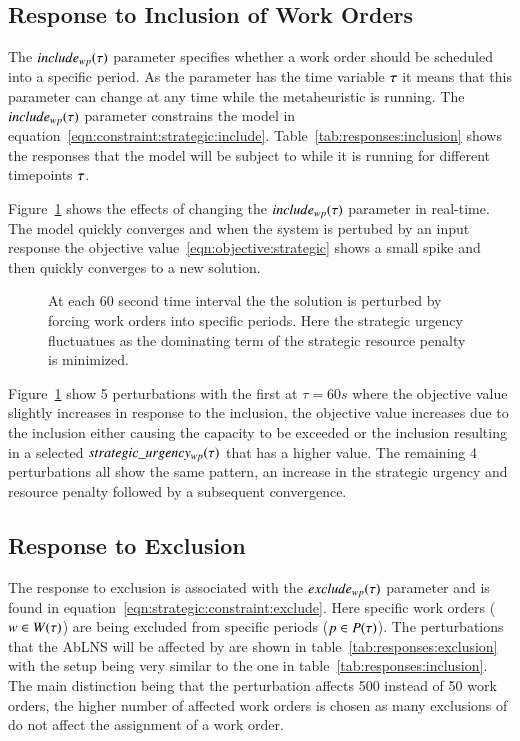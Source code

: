 \subsection{Response to Inclusion of Work Orders}\label{sec:response_work_orders}
The $include_{wp}(\tau)$ parameter specifies whether a work order
should be scheduled into a specific period. As the parameter has the time
variable $\tau$ it means that this parameter can change at any time
while the metaheuristic is running. The $include_{wp}(\tau)$ parameter
constrains the model in equation~\ref{eqn:constraint:strategic:include}.
Table~\ref{tab:responses:inclusion} shows the responses that the model will be
subject to while it is running for different timepoints $\tau$.



Figure~\ref{fig:responses:inclusion} shows the effects of changing the $
include_{wp}(\tau)$ parameter in real-time. The model quickly converges
and when the system is pertubed by an input response the objective 
value~\ref{eqn:objective:strategic} shows a small spike and then quickly converges to
a new solution.

\begin{figure}[H]
	\centering
	\resizebox{10cm}{!}{
		
	}
	\caption{At each 60 second time interval the the solution is perturbed by forcing work orders into specific
		periods. Here the strategic urgency fluctuatues as the dominating term of the strategic resource penalty
		is minimized.
	}\label{fig:responses:inclusion}
\end{figure}


Figure~\ref{fig:responses:inclusion}  show 5 perturbations with the first
at $\tau = 60s$ where the objective value slightly increases in response to
the inclusion, the objective value increases due to the inclusion either
causing the capacity to be exceeded or the inclusion resulting in a selected
$ strategic\_urgency_{wp}(\tau)$ that has a higher value. The remaining 4 perturbations
all show the same  pattern, an increase in the strategic urgency and
resource penalty  followed by a subsequent convergence.

\subsection{Response to Exclusion}\label{sec:exclusion}
The response to exclusion is associated with the $exclude_{wp}(\tau)$
parameter and is found in equation~\ref{eqn:strategic:constraint:exclude}.
Here specific work orders ($w \in W(\tau)$) are
being excluded from specific periods ($p \in P(\tau)$).
The perturbations that the AbLNS will be affected by are shown in
table~\ref{tab:responses:exclusion}
with the setup being very similar to the
one in table~\ref{tab:responses:inclusion}.
The main distinction being that the perturbation affects 500 instead of 50 work orders, the higher number 
of affected work orders is chosen as many exclusions of do not affect the assignment of a work order.

